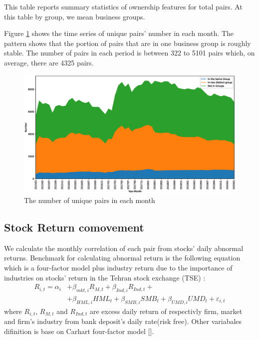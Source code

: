 \documentclass[12pt, a4paper]{article}
\begin{document}
  \begin{table}
  \centering
  \caption{ This table reports summary statistics of ownership features for total pairs. At this table by group, we mean business groups.}
  \label{t2-2}
    \resizebox{1\textwidth}{!}
          {
 
   }
    \end{table}%


 Figure \ref{g2-2} shows the time series of unique pairs' number in each month. The pattern shows that the portion of pairs that are in one business group is roughly stable. The number of pairs in each period is between 322 to 5101 pairs which, on average, there are 4325 pairs.
 
 \normalcolor
 
\begin{figure}[htbp]
\caption{ The number of unique pairs in each month}
\label{g2-2}
\includegraphics[width=\linewidth]{idMonth.eps}
\end{figure}
 
  \FloatBarrier
  
  
  
\subsection{Stock Return comovement}
\label{comovement}

We calculate the monthly correlation of each pair from stocks' daily abnormal returns. Benchmark for calculating abnormal return is the following equation which is a four-factor model plus industry return due to the importance of industries on stocks' return in the Tehran stock exchange (TSE) :
\begin{equation}
 \begin{split}
   R_{i,t} =\alpha _{i}&+\beta _{mkt,i}{\mathit {R}}_{M,t} + \beta_{Ind,i}{\mathit {R}}_{Ind,t} + \\
  &+\beta _{HML,i}{\mathit {HML}}_{t}+\beta _{SMB,i}{\mathit {SMB}}_{t}+\beta _{UMD,i}{\mathit {UMD}}_{t}+ \varepsilon_{i,t}
  \end{split}
     \label{e5Factor}
\end{equation}
where $ R_{i,t} $, $ R_{M,t} $ and $ R_{Ind,t} $ are excess daily return of respectivly  firm, market and firm's industry from bank deposit's daily rate(risk free). Other variabales difinition is base on Carhart four-factor model [\cite{Carhart4Factor}].
\end{document}
